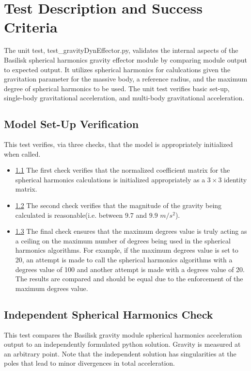 \section{Test Description and Success Criteria}
The unit test, test\_gravityDynEffector.py,  validates the internal aspects of the Basilisk spherical harmonics gravity effector module by comparing module output to expected output. It utilizes spherical harmonics for calulcations given the gravitation parameter for the massive body, a reference radius, and the maximum degree of spherical harmonics to be used. The unit test verifies basic set-up, single-body gravitational acceleration, and multi-body gravitational acceleration.

\subsection{Model Set-Up Verification}
This test verifies, via three checks, that the model is appropriately initialized when called.
		\begin{itemize}
			\item \underline{1.1} The first check verifies that the normalized coefficient matrix for the spherical harmonics calculations is initialized appropriately as a $3\times3$ identity matrix. \\
			\item \underline{1.2} The second check verifies that the magnitude of the gravity being calculated is reasonable(i.e. between $9.7$ and $9.9$ $m/s^2$). \\
			\item \underline{1.3} The final check ensures that the maximum degrees value is truly acting as a ceiling on the maximum number of degrees being used in the spherical harmonics algorithms. For example, if the maximum degrees value is set to 20, an attempt is made to call the spherical harmonics algorithms with a degrees value of 100 and another attempt is made with a degrees value of 20. The results are compared and should be equal due to the enforcement of the maximum degrees value.\\
		\end{itemize}
\subsection{Independent Spherical Harmonics Check} This test compares the Basilisk gravity module spherical harmonics acceleration output to an independently formulated python solution. Gravity is measured at an arbitrary point. Note that the independent solution has singularities at the poles that lead to minor divergences in total acceleration.
